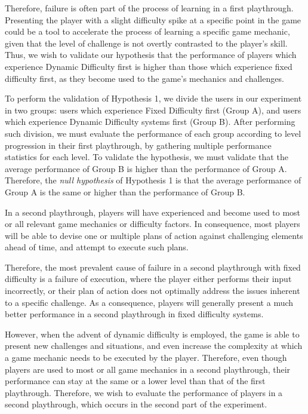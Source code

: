 Therefore, failure is often part of the process of learning in a first playthrough. Presenting the player with a slight difficulty spike at a specific point in the game could be a tool to accelerate the process of learning a specific game mechanic, given that the level of challenge is not overtly contrasted to the player's skill. Thus, we wish to validate our hypothesis that the performance of players which experience Dynamic Difficulty first is higher than those which experience fixed difficulty first, as they become used to the game's mechanics and challenges.

To perform the validation of Hypothesis 1, we divide the users in our experiment in two groups: users which experience Fixed Difficulty first (Group A), and users which experience Dynamic Difficulty systems first (Group B). After performing such division, we must evaluate the performance of each group according to level progression in their first playthrough, by gathering multiple performance statistics for each level. To validate the hypothesis, we must validate that the average performance of Group B is higher than the performance of Group A. Therefore, the \emph{null hypothesis} of Hypothesis 1 is that the average performance of Group A is the same or higher than the performance of Group B.


In a second playthrough, players will have experienced and become used to most or all relevant game mechanics or difficulty factors. In consequence, most players will be able to devise one or multiple plans of action against challenging elements ahead of time, and attempt to execute such plans. 

Therefore, the most prevalent cause of failure in a second playthrough with fixed difficulty is a failure of execution, where the player either performs their input incorrectly, or their plan of action does not optimally address the issues inherent to a specific challenge. As a consequence, players will generally present a much better performance in a second playthrough in fixed difficulty systems.

However, when the advent of dynamic difficulty is employed, the game is able to present new challenges and situations, and even increase the complexity at which a game mechanic needs to be executed by the player. Therefore, even though players are used to most or all game mechanics in a second playthrough, their performance can stay at the same or a lower level than that of the first playthrough. Therefore, we wish to evaluate the performance of players in a second playthrough, which occurs in the second part of the experiment.

